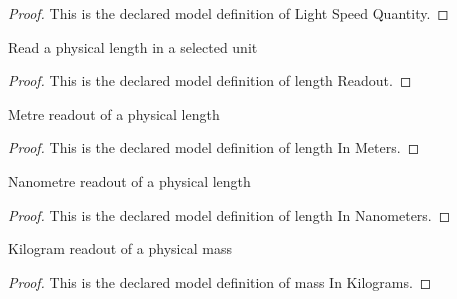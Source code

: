 \begin{proof}
  This is the declared model definition of Light Speed Quantity.
\end{proof}
\begin{definition}
  \label{def:physics:phyx-mini-0659:phyxminiproblems-problemphyxmini0659-lengthreadout}
  Read a physical length in a selected unit
\end{definition}
\begin{proof}
  This is the declared model definition of length Readout.
\end{proof}
\begin{definition}
  \label{def:physics:phyx-mini-0659:phyxminiproblems-problemphyxmini0659-lengthinmeters}
  Metre readout of a physical length
\end{definition}
\begin{proof}
  This is the declared model definition of length In Meters.
\end{proof}
\begin{definition}
  \label{def:physics:phyx-mini-0659:phyxminiproblems-problemphyxmini0659-lengthinnanometers}
  Nanometre readout of a physical length
\end{definition}
\begin{proof}
  This is the declared model definition of length In Nanometers.
\end{proof}
\begin{definition}
  \label{def:physics:phyx-mini-0659:phyxminiproblems-problemphyxmini0659-massinkilograms}
  Kilogram readout of a physical mass
\end{definition}
\begin{proof}
  This is the declared model definition of mass In Kilograms.
\end{proof}
